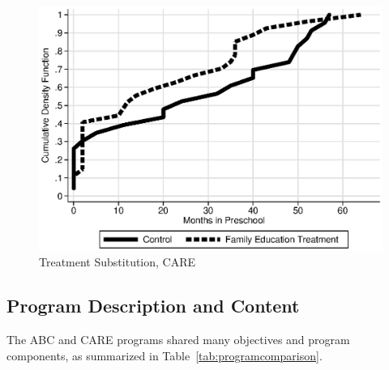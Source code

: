 \begin{figure}[H]
		\caption{Treatment Substitution, CARE} \label{fig:treatsubcare}
		\includegraphics[width=.9\columnwidth]{output/care_controlcontamination_months.eps}
\end{figure}
 


\subsection{Program Description and Content}

\noindent The ABC and CARE programs shared many objectives and program components, as summarized in Table~\ref{tab:programcomparison}.\\



